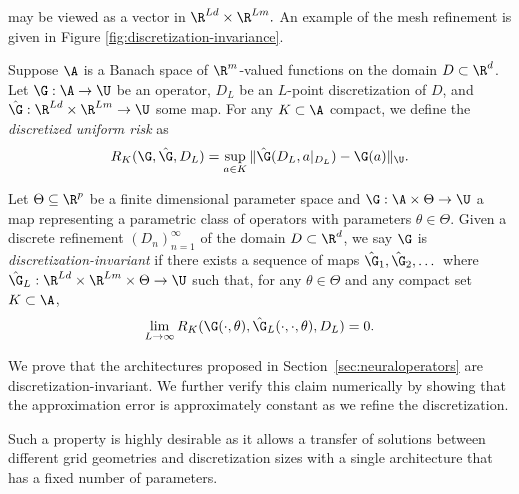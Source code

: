{may be viewed as a vector in $\R^{Ld} \times \R^{Lm}.$ An example of the mesh refinement is given in Figure \ref{fig:discretization-invariance}.
\begin{definition}
Suppose \(\A\) is a Banach space of \(\R^m\)-valued functions on the domain \(D \subset \R^d\). Let \(\G : \A \to \U\) be an operator, \(D_L\) be an \(L\)-point discretization of \(D\), and \(\hat{\G} : \R^{Ld} \times \R^{Lm} \to \U\) some map. For any \(K \subset \A\) compact, we define the \textit{discretized uniform risk} as
\[R_K (\G,\hat{\G},D_L) = \sup_{a \in K} \|\hat{\G}(D_L,a|_{D_L}) - \G(a) \|_{\U}.\]
\end{definition}



\begin{definition}\label{def:discretization_invariance}
Let \(\Theta \subseteq \R^p\) be a finite dimensional parameter space and \(\G : \A \times \Theta \to \U\) a map representing a parametric class of operators with parameters \(\theta \in \Theta\). Given a discrete refinement \((D_n)_{n=1}^\infty\) of the domain \(D \subset \R^d\), we say \(\G\) is \textit{discretization-invariant} if there exists a sequence of maps \(\hat{\G}_1, \hat{\G}_2, \dots\) where \(\hat{\G}_L : \R^{Ld} \times \R^{Lm} \times \Theta \to \U\) such that, for any \(\theta \in \Theta\) and any compact set \(K \subset \A\),
\[\lim_{L \to \infty} R_K(\G(\cdot,\theta), \hat{\G}_L(\cdot,\cdot,\theta),D_L) = 0.\]
\end{definition}
We prove that the architectures proposed in Section~\ref{sec:neuraloperators} are discretization-invariant. %
We further verify this claim numerically by showing that the approximation error is 
approximately constant as we refine the discretization.}
Such a property is highly desirable as it allows a transfer of solutions between different grid geometries and discretization sizes with a single architecture that has a fixed number of parameters. 


